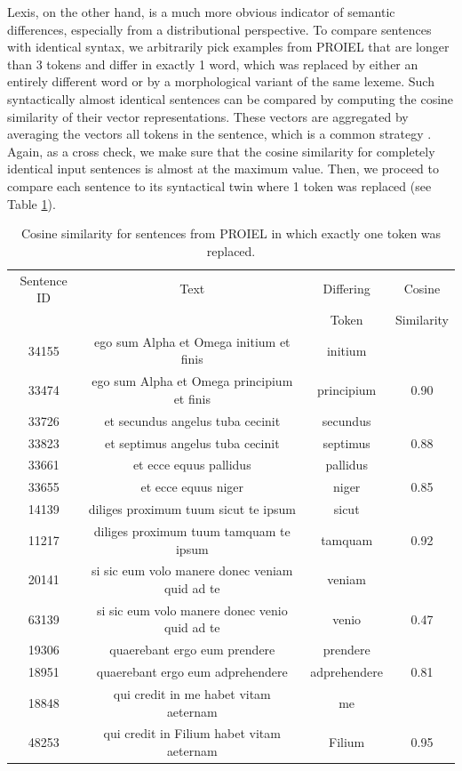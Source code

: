 \documentclass[runningheads]{llncs}
\begin{document}
Lexis, on the other hand, is a much more obvious indicator of semantic differences, especially from a distributional perspective. To compare sentences with identical syntax, we arbitrarily pick examples from PROIEL that are longer than 3 tokens and differ in exactly 1 word, which was replaced by either an entirely different word or by a morphological variant of the same lexeme. Such syntactically almost identical sentences can be compared by computing the cosine similarity of their vector representations. These vectors are aggregated by averaging the vectors all tokens in the sentence, which is a common strategy \parencite[1]{adiFinegrainedAnalysisSentence2016}. Again, as a cross check, we make sure that the cosine similarity for completely identical input sentences is almost at the maximum value. Then, we proceed to compare each sentence to its syntactical twin where 1 token was replaced (see Table \ref{tableCosSimWordSubstitution}).
\begin{table}[ht]
	\begin{tabular}{ c | c | c | c }
  		Sentence ID & Text & Differing & Cosine \\ 
		 & & Token & Similarity \\ \hline
  		34155 & ego sum Alpha et Omega initium et finis & initium & \\
		33474 & ego sum Alpha et Omega principium et finis & principium & 0.90 \\ \hline
		33726 & et secundus angelus tuba cecinit & secundus & \\
		33823 & et septimus angelus tuba cecinit & septimus & 0.88 \\ \hline
		33661 & et ecce equus pallidus & pallidus & \\
		33655 & et ecce equus niger & niger & 0.85 \\ \hline
		14139 & diliges proximum tuum sicut te ipsum & sicut & \\
		11217 & diliges proximum tuum tamquam te ipsum & tamquam & 0.92 \\ \hline
		20141 & si sic eum volo manere donec veniam quid ad te & veniam & \\
		63139 & si sic eum volo manere donec venio quid ad te & venio & 0.47 \\ \hline
		19306 & quaerebant ergo eum prendere & prendere & \\
		18951 & quaerebant ergo eum adprehendere & adprehendere & 0.81 \\ \hline
		18848 & qui credit in me habet vitam aeternam & me & \\
		48253 & qui credit in Filium habet vitam aeternam & Filium & 0.95 \\ \hline
	\end{tabular}
	\caption{Cosine similarity for sentences from PROIEL in which exactly one token was replaced.}
	\label{tableCosSimWordSubstitution}
\end{table}
\end{document}
